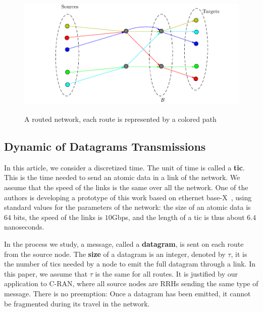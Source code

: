 \documentclass[a4paper,10pt]{article}
\begin{document}
\begin{figure}
\centering

	
	\includegraphics[scale=0.7]{graphmodel}\\

\caption{A routed network, each route is represented by a colored path}
\label{fig:graphmodel}
\end{figure} 
 

	 
	 
 	\subsection{Dynamic of Datagrams Transmissions}
	    
 		In this article, we consider a discretized time. The unit of time is called a {\bf tic}. This is the time needed to send an atomic data in a link of the network. We assume that the speed of the links is the same over all the network. One of the authors is developing a prototype of this work based on ethernet base-X~\cite{ieee_8023}, using standard values for the parameters of the network: the size of an atomic data is $64$ bits, the speed of the links is $10$Gbps, and the length of a tic is thus about $6.4$ nanoseconds. 

        In the process we study, a message, called a {\bf datagram}, is sent on each route from the source node. The \textbf{size} of a datagram is an integer, denoted by $\tau$, it is the number of tics needed by a node to emit the full datagram through a link.  In this paper, we assume that $\tau$ is the same for all routes. It is justified by our application to C-RAN, where all source nodes are RRHs sending the same type of message. There is no preemption: Once a datagram has been emitted, it cannot be fragmented during its travel in the network. 
\end{document}
